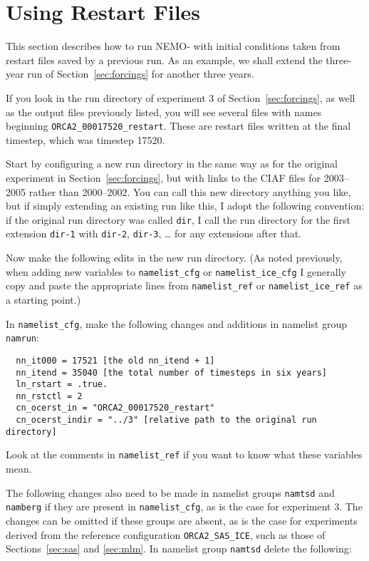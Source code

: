 \section{Using Restart Files}
\label{sec:restarts}

This section describes how to run NEMO-\SIcu{} with initial conditions taken from restart files saved by a previous run.
As an example, we shall extend the three-year run of Section~\ref{sec:forcings} for another three years.

If you look in the run directory of experiment 3 of Section~\ref{sec:forcings}, as well as the output files previously listed, you will see several files with names beginning \verb|ORCA2_00017520_restart|.
These are restart files written at the final timestep, which was timestep 17520.

Start by configuring a new run directory in the same way as for the original experiment in Section~\ref{sec:forcings}, but with links to the CIAF files for 2003--2005 rather than 2000--2002.
You can call this new directory anything you like, but if simply extending an existing run like this, I adopt the following convention: if the original run directory was called \verb|dir|, I call the run directory for the first extension \verb|dir-1| with \verb|dir-2|, \verb|dir-3|, \ldots{} for any extensions after that.

Now make the following edits in the new run directory.
(As noted previously, when adding new variables to \verb|namelist_cfg| or \verb|namelist_ice_cfg| I generally copy and paste the appropriate lines from \verb|namelist_ref| or \verb|namelist_ice_ref| as a starting point.)

In \verb|namelist_cfg|, make the following changes and additions in namelist group \verb|namrun|:

\begin{verbatim}
  nn_it000 = 17521 [the old nn_itend + 1]
  nn_itend = 35040 [the total number of timesteps in six years]
  ln_rstart = .true.
  nn_rstctl = 2
  cn_ocerst_in = "ORCA2_00017520_restart"
  cn_ocerst_indir = "../3" [relative path to the original run directory]
\end{verbatim}

\noindent{}Look at the comments in \verb|namelist_ref| if you want to know what these variables mean.

The following changes also need to be made in namelist groups \verb|namtsd| and \verb|namberg| if they are present in \verb|namelist_cfg|, as is the case for experiment 3.
The changes can be omitted if these groups are absent, as is the case for experiments derived from the reference configuration \verb|ORCA2_SAS_ICE|, such as those of Sections~\ref{sec:sas} and \ref{sec:mlm}.
In namelist group \verb|namtsd| delete the following:

